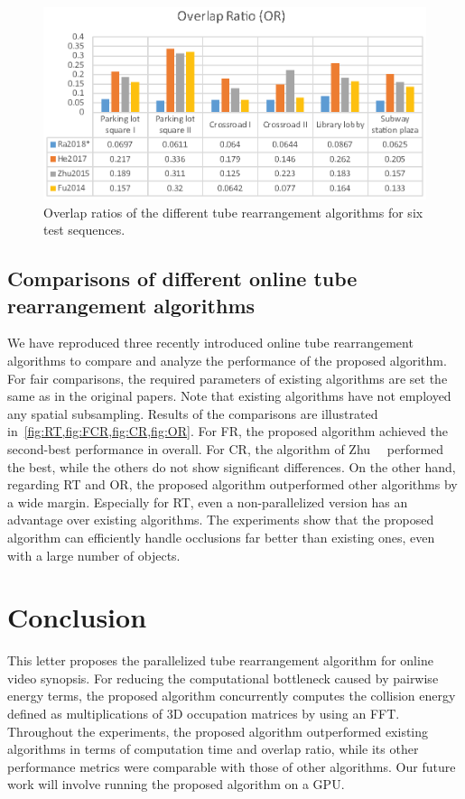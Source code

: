 \documentclass[11pt]{hyu_thesis}
\begin{document}
\begin{figure}[t]
\begin{center}
\includegraphics[width=0.9\linewidth]{OR.eps}
\end{center}
   \caption{Overlap ratios of the different tube rearrangement algorithms for six test sequences.}
\label{fig:OR}
\end{figure}

\section{Comparisons of different online tube rearrangement algorithms}
We have reproduced three recently introduced online tube rearrangement algorithms to compare and analyze the performance of the proposed algorithm. For fair comparisons, the required parameters of existing algorithms are set the same as in the original papers. Note that existing algorithms have not employed any spatial subsampling. Results of the comparisons are illustrated in~\cref{fig:RT,fig:FCR,fig:CR,fig:OR}. For FR, the proposed algorithm achieved the second-best performance in overall. For CR, the algorithm of Zhu~\etal~\cite{JianqingZhu2015} performed the best, while the others do not show significant differences. On the other hand, regarding RT and OR, the proposed algorithm outperformed other algorithms by a wide margin. Especially for RT, even a non-parallelized version has an advantage over existing algorithms. The experiments show that the proposed algorithm can efficiently handle occlusions far better than existing ones, even with a large number of objects.

\chapter{Conclusion}
\label{sec:conc}
This letter proposes the parallelized tube rearrangement algorithm for online video synopsis. For reducing the computational bottleneck caused by pairwise energy terms, the proposed algorithm concurrently computes the collision energy defined as multiplications of 3D occupation matrices by using an FFT. Throughout the experiments, the proposed algorithm outperformed existing algorithms in terms of computation time and overlap ratio, while its other performance metrics were comparable with those of other algorithms. Our future work will involve running the proposed algorithm on a GPU.



\end{document}
